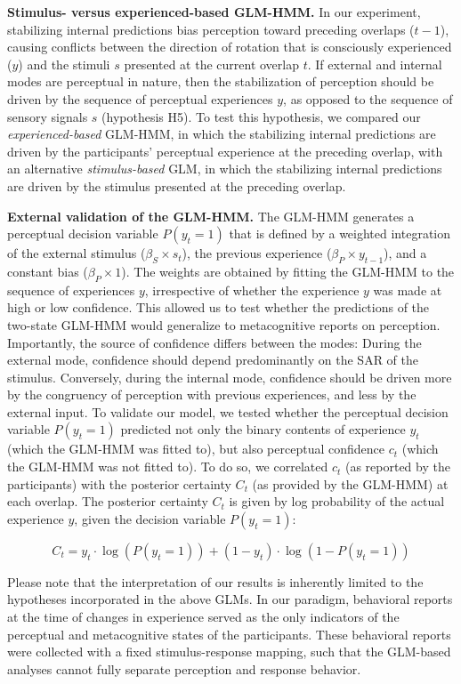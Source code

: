 \documentclass[
]{article}
\begin{document}
\textbf{Stimulus- versus experienced-based GLM-HMM.} In our experiment,
stabilizing internal predictions bias perception toward preceding
overlaps (\(t-1\)), causing conflicts between the direction of rotation
that is consciously experienced (\(y\)) and the stimuli \(s\) presented
at the current overlap \(t\). If external and internal modes are
perceptual in nature, then the stabilization of perception should be
driven by the sequence of perceptual experiences \(y\), as opposed to
the sequence of sensory signals \(s\) (hypothesis H5). To test this
hypothesis, we compared our \emph{experienced-based} GLM-HMM, in which
the stabilizing internal predictions are driven by the participants'
perceptual experience at the preceding overlap, with an alternative
\emph{stimulus-based} GLM, in which the stabilizing internal predictions
are driven by the stimulus presented at the preceding overlap.

\textbf{External validation of the GLM-HMM.} The GLM-HMM generates a
perceptual decision variable \(P(y_t = 1)\) that is defined by a
weighted integration of the external stimulus (\(\beta_S \times s_t\)),
the previous experience (\(\beta_P \times y_{t-1}\)), and a constant
bias (\(\beta_P \times 1\)). The weights are obtained by fitting the
GLM-HMM to the sequence of experiences \(y\), irrespective of whether
the experience \(y\) was made at high or low confidence. This allowed us
to test whether the predictions of the two-state GLM-HMM would
generalize to metacognitive reports on perception. Importantly, the
source of confidence differs between the modes: During the external
mode, confidence should depend predominantly on the SAR of the stimulus.
Conversely, during the internal mode, confidence should be driven more
by the congruency of perception with previous experiences, and less by
the external input. To validate our model, we tested whether the
perceptual decision variable \(P(y_t = 1)\) predicted not only the
binary contents of experience \(y_t\) (which the GLM-HMM was fitted to),
but also perceptual confidence \(c_t\) (which the GLM-HMM was not fitted
to). To do so, we correlated \(c_t\) (as reported by the participants)
with the posterior certainty \(C_t\) (as provided by the GLM-HMM) at
each overlap. The posterior certainty \(C_t\) is given by log
probability of the actual experience \(y\), given the decision variable
\(P(y_t = 1)\):

\[
C_t = y_t \cdot \log(P(y_t = 1)) + (1 - y_t) \cdot \log(1 - P(y_t = 1)) 
\]

Please note that the interpretation of our results is inherently limited
to the hypotheses incorporated in the above GLMs. In our paradigm,
behavioral reports at the time of changes in experience served as the
only indicators of the perceptual and metacognitive states of the
participants. These behavioral reports were collected with a fixed
stimulus-response mapping, such that the GLM-based analyses cannot fully
separate perception and response behavior.
\end{document}

